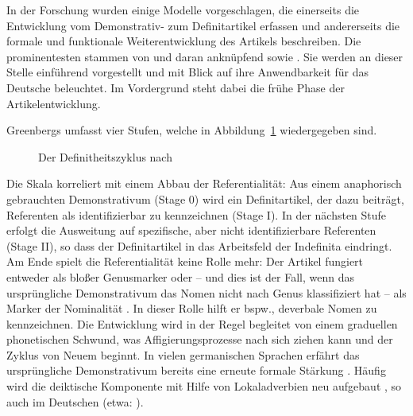 In der Forschung wurden einige Modelle vorgeschlagen, die einerseits die Entwicklung vom Demonstrativ- zum Definitartikel erfassen und andererseits die formale und funktionale Weiterentwicklung des Artikels beschreiben. Die prominentesten stammen von \textcite{Greenberg1978} und daran anknüpfend \textcite{Lehmann2015} sowie \textcite{Schmuck2014}. Sie werden an dieser Stelle einführend vorgestellt und mit Blick auf ihre Anwendbarkeit für das Deutsche beleuchtet. Im Vordergrund steht dabei die frühe Phase der Artikelentwicklung. 
%

Greenbergs  \parencite[61]{Greenberg1978} umfasst vier Stufen, welche in Abbildung~\ref{abb:greenberg} \parencite[entnommen aus][525]{deMulder2011} wiedergegeben sind.

\begin{figure}
\caption {Der Definitheitszyklus nach \textcite{Greenberg1978}\label{abb:greenberg}}
\end{figure}

Die Skala korreliert mit einem Abbau der Referentialität: Aus einem anaphorisch gebrauchten Demonstrativum (Stage 0) wird ein Definitartikel, der dazu beiträgt, Referenten als identifizierbar zu kennzeichnen (Stage I). In der nächsten Stufe erfolgt die Ausweitung auf spezifische, aber nicht identifizierbare Referenten (Stage II), so dass der Definitartikel in das Arbeitsfeld der Indefinita eindringt. Am Ende spielt die Referentialität keine Rolle mehr: Der Artikel fungiert entweder als bloßer Genusmarker oder -- und dies ist der Fall, wenn das ursprüngliche Demonstrativum das Nomen nicht nach Genus klassifiziert hat -- als Marker der Nominalität \parencite[Stage III;][69]{Greenberg1978}. In dieser Rolle hilft er bspw., deverbale Nomen zu kennzeichnen. Die Entwicklung wird in der Regel begleitet von einem graduellen phonetischen Schwund, was Affigierungsprozesse nach sich ziehen kann und der Zyklus von Neuem beginnt. In vielen germanischen Sprachen erfährt das ursprüngliche Demonstrativum bereits eine erneute formale Stärkung \parencite[302--303]{vanGelderen2007}. Häufig wird die deiktische Komponente mit Hilfe von Lokaladverbien neu aufgebaut \parencite[s.][]{Diessel1999}, so auch im Deutschen (etwa:  ). 

